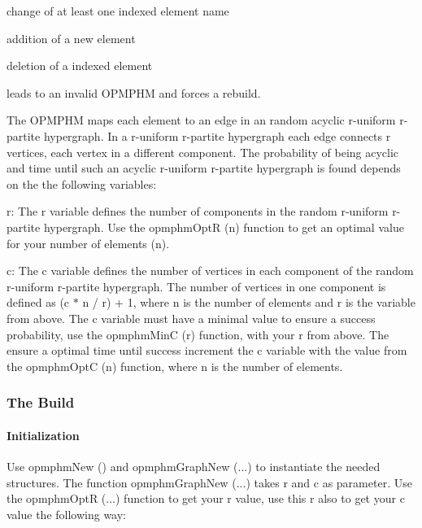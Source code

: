 \begin{DoxyItemize}
\item change of at least one indexed element name
\item addition of a new element
\item deletion of a indexed element
\end{DoxyItemize}

leads to an invalid O\+P\+M\+P\+HM and forces a rebuild.

The O\+P\+M\+P\+HM maps each element to an edge in an random acyclic r-\/uniform r-\/partite hypergraph. In a r-\/uniform r-\/partite hypergraph each edge connects {\ttfamily r} vertices, each vertex in a different component. The probability of being acyclic and time until such an acyclic r-\/uniform r-\/partite hypergraph is found depends on the the following variables\+:


\begin{DoxyItemize}
\item {\ttfamily r}\+: The {\ttfamily r} variable defines the number of components in the random r-\/uniform r-\/partite hypergraph. Use the {\ttfamily opmphm\+OptR (n)} function to get an optimal value for your number of elements ({\ttfamily n}).
\item {\ttfamily c}\+: The {\ttfamily c} variable defines the number of vertices in each component of the random r-\/uniform r-\/partite hypergraph. The number of vertices in one component is defined as {\ttfamily (c $\ast$ n / r) + 1}, where {\ttfamily n} is the number of elements and {\ttfamily r} is the variable from above. The {\ttfamily c} variable must have a minimal value to ensure a success probability, use the {\ttfamily opmphm\+MinC (r)} function, with your {\ttfamily r} from above. The ensure a optimal time until success increment the {\ttfamily c} variable with the value from the {\ttfamily opmphm\+OptC (n)} function, where {\ttfamily n} is the number of elements.
\end{DoxyItemize}

\subsubsection*{The Build}

\paragraph*{Initialization}

Use {\ttfamily opmphm\+New ()} and {\ttfamily opmphm\+Graph\+New (...)} to instantiate the needed structures. The function {\ttfamily opmphm\+Graph\+New (...)} takes {\ttfamily r} and {\ttfamily c} as parameter. Use the {\ttfamily opmphm\+OptR (...)} function to get your {\ttfamily r} value, use this {\ttfamily r} also to get your {\ttfamily c} value the following way\+:

